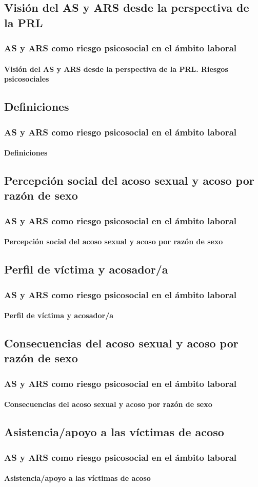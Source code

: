 \documentclass{beamer}
\begin{document}
    \subsection{Visión del AS y ARS desde la perspectiva de la PRL}
    \begin{frame}
		\frametitle{AS y ARS como riesgo psicosocial en el ámbito laboral}
        \framesubtitle{Visión del AS y ARS desde la perspectiva de la PRL. Riesgos psicosociales}
	\end{frame}

    \subsection{Definiciones}
    \begin{frame}
		\frametitle{AS y ARS como riesgo psicosocial en el ámbito laboral}
        \framesubtitle{Definiciones}
	\end{frame}

    \subsection{Percepción social del acoso sexual y acoso por razón de sexo}
    \begin{frame}
		\frametitle{AS y ARS como riesgo psicosocial en el ámbito laboral}
        \framesubtitle{Percepción social del acoso sexual y acoso por razón de sexo}
	\end{frame}

    \subsection{Perfil de víctima y acosador/a}
    \begin{frame}
		\frametitle{AS y ARS como riesgo psicosocial en el ámbito laboral}
        \framesubtitle{Perfil de víctima y acosador/a}
	\end{frame}

    \subsection{Consecuencias del acoso sexual y acoso por razón de sexo}
    \begin{frame}
		\frametitle{AS y ARS como riesgo psicosocial en el ámbito laboral}
        \framesubtitle{Consecuencias del acoso sexual y acoso por razón de sexo}
	\end{frame}

    \subsection{Asistencia/apoyo a las víctimas de acoso}
    \begin{frame}
		\frametitle{AS y ARS como riesgo psicosocial en el ámbito laboral}
        \framesubtitle{Asistencia/apoyo a las víctimas de acoso}
	\end{frame}
\end{document}
